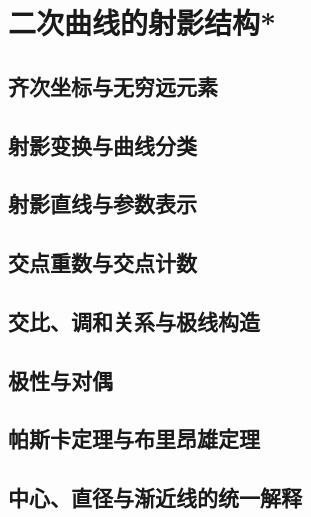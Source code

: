 \section{二次曲线的射影结构*}
\label{sec:quadratic-projective-structure}


\subsection{齐次坐标与无穷远元素}
\label{subsec:quadratic-homogeneous-coordinates}

\subsection{射影变换与曲线分类}
\label{subsec:quadratic-projective-classification}

\subsection{射影直线与参数表示}
\label{subsec:quadratic-projective-parametrization}

\subsection{交点重数与交点计数}
\label{subsec:quadratic-intersection-counting}

\subsection{交比、调和关系与极线构造}
\label{subsec:quadratic-cross-ratio-and-harmonicity}

\subsection{极性与对偶}
\label{subsec:quadratic-polarity-and-duality}

\subsection{帕斯卡定理与布里昂雄定理}
\label{subsec:quadratic-pascal-and-brianchon}

\subsection{中心、直径与渐近线的统一解释}
\label{subsec:quadratic-centers-and-infinity}

